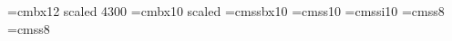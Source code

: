 \fi
%
%
%
\font\titlefont=cmbx12 scaled 4300
\font\subtitlefont=cmbx10 scaled 
\ifDR %
   \def\title#1#2#3#4#5{%
        \hbox to#5{\hss\hbox{\titlefont Descendance de #1}\hss}
        \kern1cm
        \hbox to#5{\hss\hbox{\titlefont (#2 -- #3)}\hss}
        \kern1cm
        \hbox to#5{\hss\hbox{\subtitlefont(#4 g\'en\'erations)}\hss}
        }
\else
   \def\title#1#2#3#4#5{%
        \hbox to#5{\hss\hbox{\titlefont Descendance of #1}\hss}
        \kern1cm
        \hbox to#5{\hss\hbox{\titlefont (#2 -- #3)}\hss}
        \kern1cm
        \hbox to#5{\hss\hbox{\subtitlefont(#4 generations)}\hss}
        }
\fi
\font\descfont=cmssbx10     %
\font\spousefont=cmss10     %
\font\occufont=cmssi10      %
\font\datefont=cmss8        %
\font\placefont=cmss8       %
\def\spouse#1{\spousefont#1}
\def\occupation#1{{\setbox0=\hbox{\occufont#1}%
                   \ifdim\wd0>5cm
                       \vbox{\hsize5cm\pretolerance10000
                             \raggedright\noindent\occufont#1\endgraf}%
                   \else
                     {\occufont#1}%
                   \fi
                   }}
\def\sepline{\noalign{\kern2pt\hrule\kern2pt}}
\def\btag{$\circ$}
